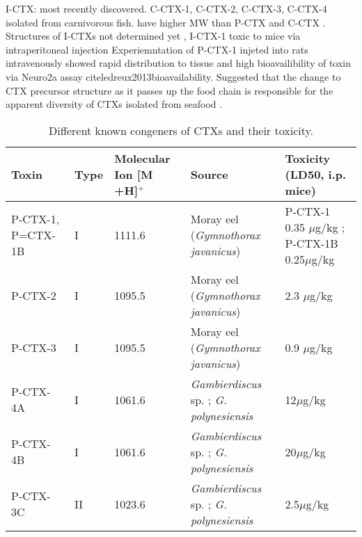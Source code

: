 \documentclass[12pt]{article}
\begin{document}
I-CTX: most recently discovered. C-CTX-1, C-CTX-2, C-CTX-3, C-CTX-4 isolated from carnivorous fish. have higher MW than P-CTX and C-CTX \cite{caillaud2010update,hamilton2002multiple,hamilton2002isolation}. Structures of I-CTXs not determined yet \cite{hamilton2002multiple,hamilton2002isolation}, I-CTX-1 toxic to mice via intraperitoneal injection \cite{hamilton2002isolation}
Experiemntation of P-CTX-1 injeted into rats intravenously showed rapid distribution to tissue and high bioavailibility of toxin via Neuro2a assay 
cite{ledreux2013bioavailability}.
Suggested that the change to CTX precursor structure as it passes up the food chain is responsible for the apparent diversity of CTXs isolated from seafood \cite{hokama1996human}.

\begin{sidewaystable}[!htbp]
\caption{Different known congeners of CTXs and their toxicity.}
\begin{tabular}{ |  p{4cm} | p{2cm} | p{2cm} | p{6cm} | p{6cm} | }
\hline
\textbf{Toxin} & \textbf{Type} & \textbf{Molecular Ion [M +H]$^{+}$} & \textbf{Source} & \textbf{Toxicity (LD50, i.p. mice)} \\
\hline
P-CTX-1, P=CTX-1B & I & 1111.6 & Moray eel (\emph{Gymnothorax javanicus}) \cite{murata1990structures,lewis1991purification} & P-CTX-1 0.35 $\mu$g/kg \cite{murata1990structures}; P-CTX-1B 0.25$\mu$g/kg \cite{lewis1991purification} \\
\hline
P-CTX-2 & I & 1095.5 \cite{lewis1991purification} & Moray eel (\emph{Gymnothorax javanicus}) \cite{lewis1991purification} & 2.3 $\mu$g/kg \cite{lewis1991purification} \\
\hline
 P-CTX-3 & I & 1095.5 \cite{lewis1991purification} & Moray eel (\emph{Gymnothorax javanicus}) \cite{lewis1991purification} & 0.9 $\mu$g/kg \cite{lewis1991purification} \\
\hline
 P-CTX-4A & I & 1061.6 \cite{yasumoto2000structural} & \emph{Gambierdiscus} sp. \cite{yasumoto2000structural}; \emph{G. polynesiensis} \cite{chinain2010growth} & 12$\mu$g/kg \cite{chinain2010growth} \\
\hline
 P-CTX-4B & I & 1061.6 \cite{yasumoto2000structural} & \emph{Gambierdiscus} sp. \cite{yasumoto2000structural}; \emph{G. polynesiensis} \cite{chinain2010growth} & 20$\mu$g/kg \cite{chinain2010growth}\\
\hline
 P-CTX-3C & II & 1023.6 \cite{satake1993structure} &  \emph{Gambierdiscus} sp. \cite{satake1993structure}; \emph{G. polynesiensis} \cite{chinain2010growth} & 2.5$\mu$g/kg \cite{chinain2010growth}\\

\end{tabular}
\end{sidewaystable}
\end{document}
